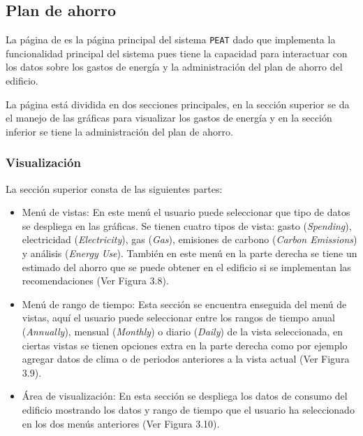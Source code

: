 \subsection{Plan de ahorro}

La página de  es la página principal del sistema
\texttt{PEAT} dado que implementa la funcionalidad principal del sistema
pues tiene la capacidad para interactuar con los datos sobre los gastos de
energía y la administración del plan de ahorro del edificio.

La página está dividida en dos secciones principales, en la sección superior
se da el manejo de las gráficas para visualizar los gastos de energía y en la
sección inferior se tiene la administración del plan de ahorro.

\subsubsection{Visualización}

La sección superior consta de las siguientes partes:
\begin{itemize}
\item Menú de vistas: En este menú el usuario puede seleccionar
  que tipo de datos se despliega en las gráficas. Se tienen cuatro tipos
  de vista: gasto (\textit{Spending}), electricidad (\textit{Electricity}), gas
  (\textit{Gas}), emisiones de carbono (\textit{Carbon Emissions}) y análisis
  (\textit{Energy Use}). También en este menú en la parte derecha se
  tiene un estimado del ahorro que se puede obtener en el edificio
  si se implementan las recomendaciones (Ver Figura 3.8).
\item Menú de rango de tiempo: Esta sección se encuentra enseguida del menú de
  vistas, aquí el usuario puede seleccionar entre los rangos de tiempo anual
  (\textit{Annually}), mensual (\textit{Monthly}) o diario (\textit{Daily}) de la
  vista seleccionada, en ciertas vistas se tienen opciones extra en la parte
  derecha como por ejemplo agregar datos de clima o de periodos anteriores
  a la vista actual (Ver Figura 3.9).
\item Área de visualización: En esta sección se despliega los datos de consumo
  del edificio mostrando los datos y rango de tiempo que el usuario ha seleccionado
  en los dos menús anteriores (Ver Figura 3.10).
\end{itemize}

